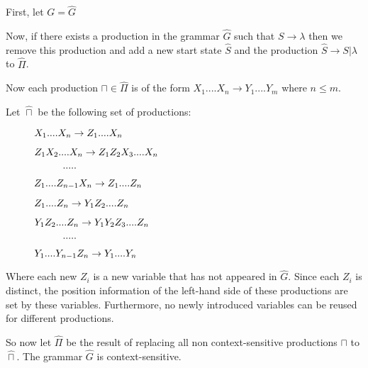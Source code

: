 \documentclass{assignment}
\begin{document}
\begin{problemlist}
\begin{answer}
    First, let $G = \hat{G}$
    
    Now, if there exists a production in the grammar $\hat{G}$ such that $S \rightarrow \lambda$  then we remove this production and add a new start state $\hat{S}$ and the production $\hat{S} \rightarrow S|\lambda$ to $\hat{\Pi}$.
    
    Now each production $\sqcap \in \hat{\Pi}$ is of the form $X_{1}....X_{n} \rightarrow Y_{1}....Y_{m}$ where $ n \leq m$.
    
    Let $\hat{\sqcap}$ be the following set of productions:
    
    $\hspace{10mm} X_{1}....X_{n} \rightarrow Z_{1}....X_{n}$
    
    $\hspace{10mm} Z_{1}X_{2}....X_{n} \rightarrow Z_{1}Z_{2}X_{3}....X_{n}$
    
    $\hspace{20mm} . . . . .$
    
    $\hspace{10mm} Z_{1}....Z_{n-1}X_{n} \rightarrow Z_{1}....Z_{n}$
    
    $\hspace{10mm} Z_{1}....Z_{n} \rightarrow Y_{1}Z_{2}....Z_{n}$
    
    $\hspace{10mm} Y_{1}Z_{2}....Z_{n} \rightarrow Y_{1}Y_{2}Z_{3}....Z_{n}$
    
    $\hspace{20mm} . . . . .$
    
    $\hspace{10mm} Y_{1}....Y_{n-1}Z_{n} \rightarrow Y_{1}....Y_{n}$
    
    Where each new $Z_{i}$ is a new variable that has not appeared in $\hat{G}$. Since each $Z_{i}$ is distinct, the position information of the left-hand side of these productions are set by these variables. Furthermore, no newly introduced variables can be reused for different productions.
    
    \medskip
    
    So now let $\hat{\Pi}$ be the result of replacing all non context-sensitive productions $\sqcap$ to $\hat{\sqcap}$. The grammar $\hat{G}$ is context-sensitive. 
    
  \end{answer}
  
  \pbitem
  \begin{problem}
  \end{problem}
  \begin{answer}
    

\end{answer}
\end{problemlist}
\end{document}
